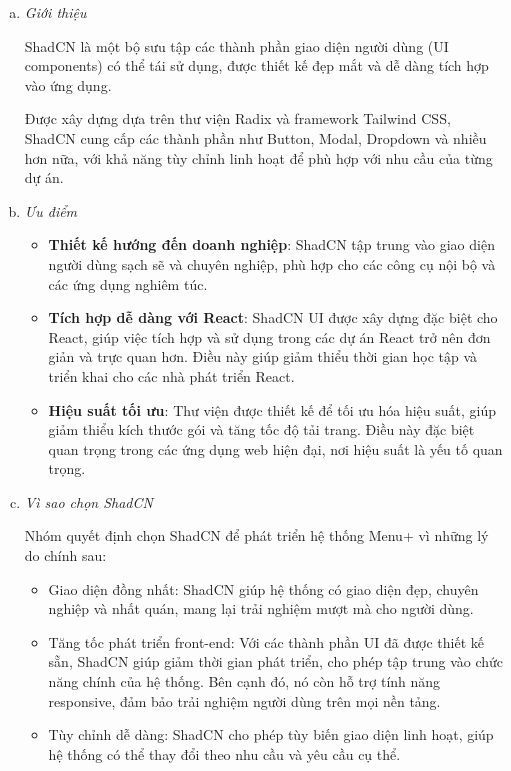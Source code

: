     \begin{enumerate}[(a)]
        \item \textit{Giới thiệu}

            ShadCN là một bộ sưu tập các thành phần giao diện người dùng (UI components) có thể tái sử dụng, được thiết kế đẹp mắt và dễ dàng tích hợp vào ứng dụng.

            Được xây dựng dựa trên thư viện Radix và framework Tailwind CSS, ShadCN cung cấp các thành phần như Button, Modal, Dropdown và nhiều hơn nữa, với khả năng tùy chỉnh linh hoạt để phù hợp với nhu cầu của từng dự án.

        \item \textit{Ưu điểm}

        \begin{itemize}
            \item \textbf{Thiết kế hướng đến doanh nghiệp}: ShadCN tập trung vào giao diện người dùng sạch sẽ và chuyên nghiệp, phù hợp cho các công cụ nội bộ và các ứng dụng nghiêm túc.
            \item \textbf{Tích hợp dễ dàng với React}: ShadCN UI được xây dựng đặc biệt cho React, giúp việc tích hợp và sử dụng trong các dự án React trở nên đơn giản và trực quan hơn. Điều này giúp giảm thiểu thời gian học tập và triển khai cho các nhà phát triển React.
            \item \textbf{Hiệu suất tối ưu}: Thư viện được thiết kế để tối ưu hóa hiệu suất, giúp giảm thiểu kích thước gói và tăng tốc độ tải trang. Điều này đặc biệt quan trọng trong các ứng dụng web hiện đại, nơi hiệu suất là yếu tố quan trọng.
        \end{itemize}

        \item \textit{Vì sao chọn ShadCN} 

            Nhóm quyết định chọn ShadCN để phát triển hệ thống Menu+ vì những lý do chính sau:

            \begin{itemize}
                \item Giao diện đồng nhất: ShadCN giúp hệ thống có giao diện đẹp, chuyên nghiệp và nhất quán, mang lại trải nghiệm mượt mà cho người dùng.
                \item Tăng tốc phát triển front-end: Với các thành phần UI đã được thiết kế sẵn, ShadCN giúp giảm thời gian phát triển, cho phép tập trung vào chức năng chính của hệ thống. Bên cạnh đó, nó còn hỗ trợ tính năng responsive, đảm bảo trải nghiệm người dùng trên mọi nền tảng.
                \item Tùy chỉnh dễ dàng: ShadCN cho phép tùy biến giao diện linh hoạt, giúp hệ thống có thể thay đổi theo nhu cầu và yêu cầu cụ thể.
            \end{itemize}


\end{enumerate}
